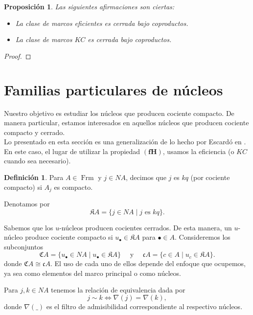 \documentclass[11pt]{amsart}
\DeclareMathOperator{\Frm}{Frm}
\theoremstyle{plain}
\newtheorem{prop}[thm]{Proposición}
\theoremstyle{definition}
\newtheorem{dfn}[thm]{Definición}
\begin{document}
\begin{prop}\label{coprod}
Las siguientes afirmaciones son ciertas:
\begin{itemize}
\item[(1)] La clase de marcos eficientes es cerrada bajo coproductos.
\item[(2)] La clase de marcos $KC$ es cerrada bajo coproductos. 
\end{itemize}	
\end{prop}

\begin{proof}

\end{proof}

\section{Familias particulares de núcleos}
Nuestro objetivo es estudiar los núcleos que producen cociente compacto. De manera particular, estamos interesados en 
aquellos núcleos que producen cociente compacto y cerrado.\\

Lo presentado en esta sección es una generalización de lo hecho por Escardó en \cite{escardo2006compactly}. En este caso, el lugar de utilizar la propiedad
$\mathbf{(fH)}$, usamos la eficiencia (o $KC$ cuando sea necesario).

\begin{dfn}\label{Definicion2.1}
Para $A\in \Frm$ y $j\in NA$, decimos que $j$ es $kq$ (por cociente compacto) si $A_j$ es compacto.  
\end{dfn}

Denotamos por 
\[
\mathfrak{K}A=\{j\in NA\mid j \mbox{ es } kq\}.
\]

Sabemos que los $u$-núcleos producen cocientes cerrados. De esta manera, un $u$-núcleo produce cociente compacto si $u_{\bullet}\in \mathfrak{K}A$ para $\bullet\in A$. Consideremos los subconjuntos
\[
\mathfrak{C}A=\{u_\bullet\in NA\mid u_\bullet\in \mathfrak{K}A\}\quad \mbox{ y }\quad \mathfrak{c}A=\{c\in A\mid u_c\in \mathfrak{K}A\}.
\]
donde $\mathfrak{C}A\cong \mathfrak{c}A$. El uso de cada uno de ellos depende del enfoque que ocupemos, ya sea como elementos del marco principal o como núcleos.

Para $j, k\in NA$ tenemos la relación de equivalencia dada por 
\[
j\sim k \Leftrightarrow \nabla(j)=\nabla(k),
\]
donde $\nabla( \_ )$ es el filtro de admisibilidad correspondiente al respectivo núcleos.\\
\end{document}
